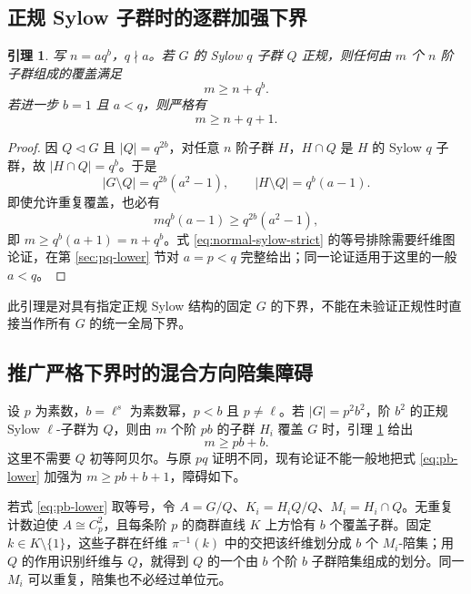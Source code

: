 \documentclass[11pt,a4paper]{article}
\numberwithin{equation}{section}
\theoremstyle{plain}
\newtheorem{lemma}[theorem]{引理}
\theoremstyle{definition}
\theoremstyle{remark}
\begin{document}
\subsection{正规 Sylow 子群时的逐群加强下界}\label{sec:sylow}
\begin{lemma}\label{lem:normal-sylow}
写 $n=aq^b$，$q\nmid a$。若 $G$ 的 Sylow $q$ 子群 $Q$ 正规，则任何由 $m$ 个 $n$ 阶子群组成的覆盖满足
\begin{equation}\label{eq:normal-sylow}
 m\ge n+q^b.
\end{equation}
若进一步 $b=1$ 且 $a<q$，则严格有
\begin{equation}\label{eq:normal-sylow-strict}
 m\ge n+q+1.
\end{equation}
\end{lemma}
\begin{proof}
因 $Q\triangleleft G$ 且 $|Q|=q^{2b}$，对任意 $n$ 阶子群 $H$，$H\cap Q$ 是 $H$ 的 Sylow $q$ 子群，故 $|H\cap Q|=q^b$。于是
\begin{equation}
 |G\setminus Q|=q^{2b}(a^2-1),
 \qquad |H\setminus Q|=q^b(a-1).
\end{equation}
即使允许重复覆盖，也必有
\begin{equation}
 m q^b(a-1)\ge q^{2b}(a^2-1),
\end{equation}
即 $m\ge q^b(a+1)=n+q^b$。式 \eqref{eq:normal-sylow-strict} 的等号排除需要纤维图论证，在第 \ref{sec:pq-lower} 节对 $a=p<q$ 完整给出；同一论证适用于这里的一般 $a<q$。
\end{proof}
此引理是对具有指定正规 Sylow 结构的固定 $G$ 的下界，不能在未验证正规性时直接当作所有 $G$ 的统一全局下界。

\subsection{推广严格下界时的混合方向陪集障碍}\label{sec:mixed-cosets}
设 $p$ 为素数，$b=\ell^s$ 为素数幂，$p<b$ 且 $p\ne\ell$。若 $|G|=p^2b^2$，阶 $b^2$ 的正规 Sylow $\ell$-子群为 $Q$，则由 $m$ 个阶 $pb$ 的子群 $H_i$ 覆盖 $G$ 时，引理 \ref{lem:normal-sylow} 给出
\begin{equation}\label{eq:pb-lower}
 m\ge pb+b.
\end{equation}
这里不需要 $Q$ 初等阿贝尔。与原 $pq$ 证明不同，现有论证不能一般地把式 \eqref{eq:pb-lower} 加强为 $m\ge pb+b+1$，障碍如下。

若式 \eqref{eq:pb-lower} 取等号，令 $A=G/Q$、$K_i=H_iQ/Q$、$M_i=H_i\cap Q$。无重复计数迫使 $A\cong C_p^2$，且每条阶 $p$ 的商群直线 $K$ 上方恰有 $b$ 个覆盖子群。固定 $k\in K\setminus\{1\}$，这些子群在纤维 $\pi^{-1}(k)$ 中的交把该纤维划分成 $b$ 个 $M_i$-陪集；用 $Q$ 的作用识别纤维与 $Q$，就得到 $Q$ 的一个由 $b$ 个阶 $b$ 子群陪集组成的划分。同一 $M_i$ 可以重复，陪集也不必经过单位元。
\end{document}
